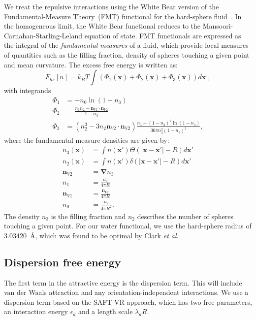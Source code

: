 \documentclass[letterpaper,twocolumn,amsmath,amssymb,prb]{revtex4-1}
\newcommand{\xx}{\textbf{x}}
\begin{document}
We treat the repulsive interactions using the White Bear version of
the Fundamental-Measure Theory~(FMT) functional for the hard-sphere
fluid~\cite{roth2002whitebear}.  In the homogeneous limit, the White
Bear functional reduces to the Mansoori-Carnahan-Starling-Leland
equation of state.  FMT functionals are expressed as the integral of
the \emph{fundamental measures} of a fluid, which provide local
measures of quantities such as the filling fraction, density of
spheres touching a given point and mean curvature.  The excess free
energy is written as:
\begin{equation}
F_{hs}[n] = k_B T \int (\Phi_1(\xx) + \Phi_2(\xx) + \Phi_3(\xx)) d\xx \; ,
\end{equation}
with integrands
\begin{align}
\Phi_1 &= -n_0 \ln\left( 1 - n_3\right)\\
\Phi_2 &= \frac{n_1 n_2 - \mathbf{n}_{V1} \cdot\mathbf{n}_{V2}}{1-n_3} \\
\Phi_3 &= (n_2^3 - 3n_2 \mathbf{n}_{V2} \cdot \mathbf{n}_{V2})
  \frac{
    n_3 + (1-n_3)^2\ln(1-n_3)
  }{
    36\pi n_3^2\left( 1 - n_3 \right)^2
  } ,
\end{align}
where the fundamental measure densities are given by:
\begin{align}
  n_3(\xx) &= \int n(\xx') \Theta(\left|\xx - \xx'\right| - R) d\xx' \\
  n_2(\xx) &= \int n(\xx') \delta(\left|\xx - \xx'\right| - R) d\xx'
  \\
  \mathbf{n}_{V2} &= \mathbf{\nabla} n_3 \\
  n_1 &= \frac{n_2}{4\pi R}\\
  \mathbf{n}_{V1} &= \frac{\mathbf{n}_{V2}}{4\pi R}\\
  n_0 &= \frac{n_2}{4\pi R^2}.
\end{align}
The density $n_3$ is the filling fraction and $n_2$ describes the number
of spheres touching a given point. For our water functional, we use the 
hard-sphere radius of
3.03420~\AA, which was found to be optimal by Clark
\emph{et al}.\cite{clark2006developing}

\newcommand\etadisp{\ensuremath{\eta_\textit{d}}}
\newcommand\epsilondisp{\ensuremath{\epsilon_\textit{d}}}
\newcommand\epsilonassoc{\ensuremath{\epsilon_\textit{a}}}
\newcommand\kappaassoc{\ensuremath{\kappa_\textit{a}}}
\newcommand\lambdadisp{\ensuremath{\lambda_\textit{d}}}
\newcommand\lscale{\ensuremath{s_d}}
\subsection{Dispersion free energy}
The first term in the attractive energy is the dispersion term.  This
will include van der Waals attraction and any orientation-independent
interactions. We use a dispersion term based on the SAFT-VR
approach\cite{gil-villegas-1997-SAFT-VR}, which has two free
parameters, an interaction energy $\epsilondisp$ and a
length scale $\lambdadisp R$.
\end{document}
